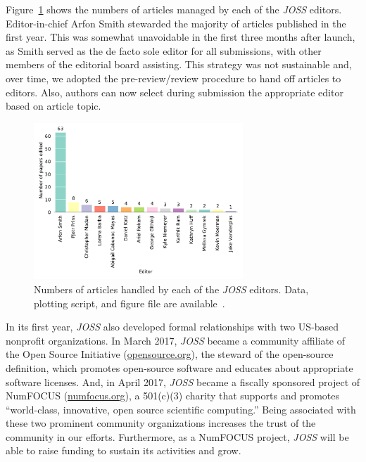 \documentclass{article}
\newcommand\joss{\textit{JOSS}}
\begin{document}
Figure~\ref{fig:editors} shows the numbers of articles managed by each of the
\joss{} editors.
Editor-in-chief Arfon Smith stewarded
the majority of articles published in the
first year. This was somewhat unavoidable
in the first three months after launch, as
Smith served as the de facto sole editor for all submissions, with other members of the editorial
board assisting.
This strategy was not sustainable and, over time, we adopted the pre-review\slash review procedure to hand off articles to editors.
Also, authors can now select during submission the appropriate editor based on article topic.


\begin{figure}[htbp]
    \centering
    \includegraphics[width=0.7\textwidth]{JOSS-editor-counts.pdf}
    \caption{Numbers of articles handled by each of the \joss{}
    editors. Data, plotting script, and figure file are available~\cite{JOSS-data-figs}.
    }
    \label{fig:editors}
\end{figure}

In its first year, \joss{} also developed formal relationships with two US-based nonprofit organizations. In March 2017, \joss{} became a community affiliate of the Open Source Initiative (\href{https://opensource.org}{opensource.org}), the steward of the open-source definition, which promotes open-source software and educates about appropriate software licenses.
And, in April 2017, \joss{} became a fiscally sponsored project of NumFOCUS (\href{https://www.numfocus.org}{numfocus.org}), a 501(c)(3) charity that supports and promotes ``world-class, innovative, open source scientific computing.''
Being associated with these two prominent community organizations increases the trust of the community in our efforts.
Furthermore, as a NumFOCUS project, \joss{} will be able to raise funding to sustain its activities and grow.
\end{document}
